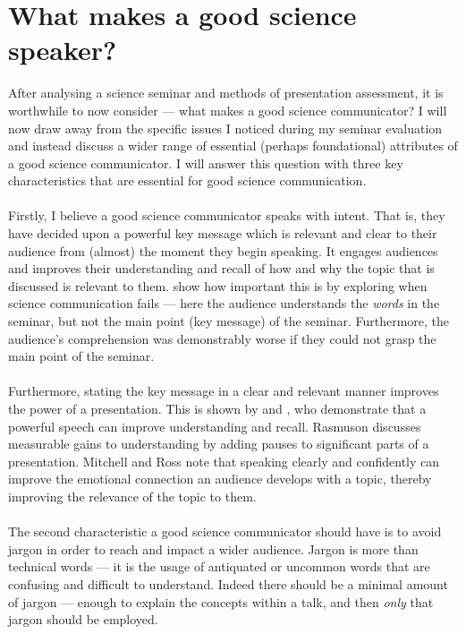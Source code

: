 \section{What makes a good science speaker?} \label{discussion}

After analysing a science seminar and methods of presentation assessment, it is
worthwhile to now consider --- what makes a good science communicator?
I will now draw away from the specific issues I noticed during my seminar
evaluation and instead discuss a wider range of essential (perhaps foundational) attributes of a
good science communicator.
I will answer this question with three key characteristics that are essential for good science
communication.\\
\\
Firstly, I believe a good science communicator speaks with intent.
That is, they have decided upon a powerful key message which is relevant and clear to their
audience from (almost) the moment they begin speaking.
It engages audiences and improves their understanding and recall of how and why the topic that is
discussed is relevant to them.
\cite{olsen1990point} show how important this is by exploring when science communication fails ---
here the audience understands the {\em words} in the seminar, but not the main point (key message) of the seminar.
Furthermore, the audience's comprehension was demonstrably worse if they could not grasp the main
point of the seminar.\\
\\
Furthermore, stating the key message in a clear and relevant manner improves the power of a
presentation.
This is shown by \cite{rasmuson1987effects} and \cite{Mitchell2013471}, who demonstrate that a
powerful speech can improve understanding and recall.
Rasmuson discusses measurable gains to understanding by adding pauses to significant parts of a
presentation.
Mitchell and Ross note that speaking clearly and confidently can improve the emotional connection an
audience develops with a topic, thereby improving the relevance of the topic to them.\\
\\
The second characteristic a good science communicator should have is to avoid jargon in order to
reach and impact a wider audience.
Jargon is more than technical words --- it is the usage of antiquated or uncommon words that are
confusing and difficult to understand.
Indeed there should be a minimal amount of jargon --- enough to explain
the concepts within a talk, and then {\em only} that jargon should be employed.
